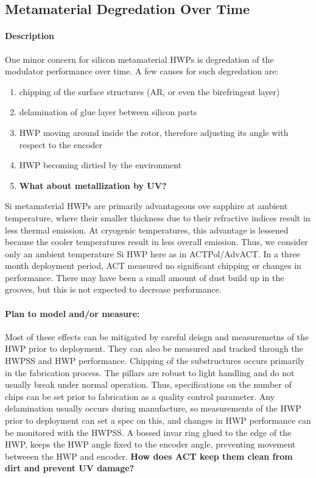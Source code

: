 \subsection{Metamaterial Degredation Over Time}

\paragraph{Description} 

One minor concern for silicon metamaterial HWPs is degredation of the modulator performance over time.  A few causes for such degredation are:

\begin{enumerate}
	\item chipping of the surface structures (AR, or even the birefringent layer)
	\item delamination of glue layer between silicon parts
	\item HWP moving around inside the rotor, therefore adjusting its angle with respect to the encoder
	\item HWP becoming dirtied by the environment
	\item \textbf{What about metallization by UV?}
\end{enumerate}

Si metamaterial HWPs are primarily advantageous ove sapphire at ambient temperature, where their smaller thickness due to their refractive indices result in less thermal emission. At cryogenic temperatures, this advantage is lessened because the cooler temperatures result in less overall emission. Thus, we consider only an ambient temperature Si HWP here as in ACTPol/AdvACT. In a three month deployment period, ACT measured no significant chipping or changes in performance.  There may have been a small amount of dust build up in the grooves, but this is not expected to decrease performance.
  
\paragraph{Plan to model and/or measure:}
Most of these effects can be mitigated by careful deisgn and measuremetns of the HWP prior to deployment. They can also be measured and tracked through the HWPSS and HWP performance. Chipping of the substructures occurs primarily in the fabrication process. The pillars are robust to light handling and do not usually break under normal operation. Thus, specifications on the number of chips can be set prior to fabrication as a quality control parameter. Any delamination usually occurs during manufacture, so measurements of the HWP prior to deployment can set a spec on this, and changes in HWP performance can be monitored with the HWPSS. A bossed invar ring glued to the edge of the HWP, keeps the HWP angle fixed to the encoder angle, preventing movement betweeen the HWP and encoder. \textbf{How does ACT keep them clean from dirt and prevent UV damage?}

